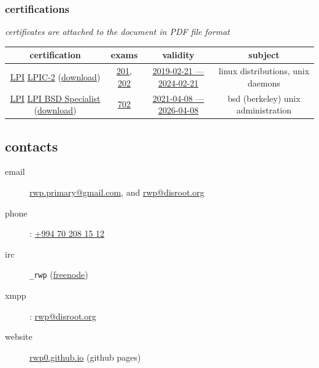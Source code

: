 \documentclass{article}
\begin{document}
        \subsubsection{certifications}
        \centering
        \textit{certificates are attached to the document in PDF file format} \\
          \begin{tabular}{ c | c | c | c }
            \hline			
            certification & exams & validity & subject \\
            \hline  
            \href{https://en.wikipedia.org/wiki/Linux_Professional_Institute}{LPI} \href{https://www.lpi.org/our-certifications/lpic-2-overview}{LPIC-2} (\href{https://cs.lpi.org/caf/Xamman/candidate_area/certificate/LPIC-2/bafrejwgeb}{download}) & \href{https://www.lpi.org/our-certifications/exam-201-objectives}{201}, \href{https://www.lpi.org/our-certifications/exam-202-objectives}{202} & \href{https://cs.lpi.org/caf/Xamman/certification/verify/LPI000307519/bafrejwgeb}{2019-02-21 --- 2024-02-21} & linux distributions, unix daemons \\
            \href{https://en.wikipedia.org/wiki/Linux_Professional_Institute}{LPI} \href{https://www.lpi.org/our-certifications/bsd-overview}{LPI BSD Specialist} (\href{https://cs.lpi.org/caf/Xamman/candidate_area/certificate/BSDS/mvuk2szhhw}{download}) & \href{https://www.lpi.org/our-certifications/exam-702-objectives}{702} & \href{https://cs.lpi.org/caf/Xamman/certification/verify/LPI000307519/mvuk2szhhw}{2021-04-08 --- 2026-04-08} & bsd (berkeley) unix administration \\
            \hline  
          \end{tabular}
     \subsection{contacts}
       \begin{description}
         \item[email] \href{mailto:rwp.primary@gmail.com}{rwp.primary@gmail.com}, and \href{mailto:rwp@disroot.org}{rwp@disroot.org}
         \item[phone]: \href{tel:+994702081512}{+994 70 208 15 12}
         \item[irc] \verb|_rwp| (\href{https://freenode.net/}{freenode})
         \item[xmpp]: \url{rwp@disroot.org}
         \item[website] \href{https://rwp0.github.io/}{rwp0.github.io} (github pages)
       \end{description}
\end{document}
